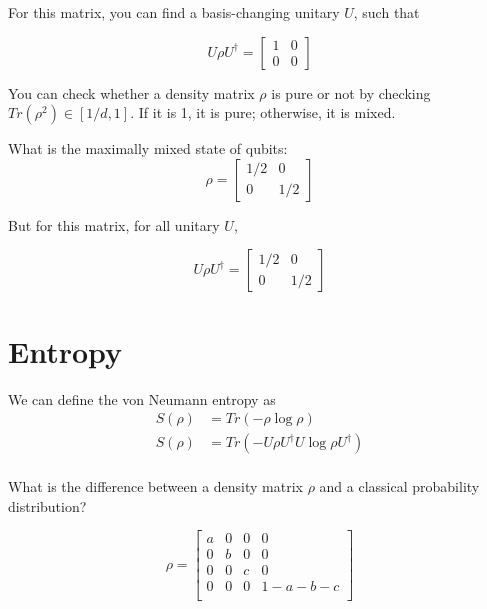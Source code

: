 \documentclass[%
 reprint,
superscriptaddress,
 amsmath,amssymb,
 aps,
]{revtex4-2}
\begin{document}
For this matrix, you can find a basis-changing unitary $U$, such that

\begin{equation}
    U\rho U^\dagger = \begin{bmatrix}
        1 & 0\\
        0 & 0
    \end{bmatrix}
\end{equation}


You can check whether a density matrix $\rho$ is pure or not by checking $Tr(\rho^2)\in [1/d, 1]$. If it is 1, it is pure; otherwise, it is mixed.

What is the maximally mixed state of qubits:
\begin{equation}
    \rho = \begin{bmatrix}
        1/2 & 0\\
        0 & 1/2
    \end{bmatrix}
\end{equation}

But for this matrix, for all unitary $U$, 

\begin{equation}
    U\rho U^\dagger = \begin{bmatrix}
        1/2 & 0\\
        0 & 1/2
    \end{bmatrix}
\end{equation}

\section{Entropy}

We can define the von Neumann entropy as
\begin{equation}
\begin{split}
    S(\rho)&=Tr(-\rho\log \rho)\\
    S(\rho)&=Tr(-U\rho U^\dagger U \log \rho U^\dagger)\\
\end{split}
\end{equation}

What is the difference between a density matrix $\rho$ and a classical probability distribution?

\begin{equation}
    \rho = \begin{bmatrix}
        a & 0 & 0 & 0\\
        0 & b & 0 & 0\\
        0 & 0 & c & 0\\
        0 & 0 & 0 & 1-a-b-c\\
    \end{bmatrix}
\end{equation}
\end{document}
